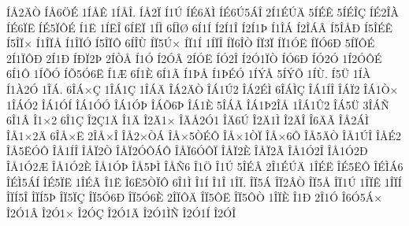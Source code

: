 {^^cd^^c52^^c4^^d2
^^cd^^c56^^d6^^c9
1^^cd^^c5^^ca
1^^cd^^c5^^ce.
^^cd^^c52^^cf
^^cd1^^da
^^cd^^c96^^c4^^cc
^^cd^^c96^^da5^^c1^^ce
2^^cd1^^c9^^da^^c4
5^^cd^^c9^^ca
5^^cd^^c9^^ce^^c7
^^cd^^c92^^ce^^c0
^^cd^^c96^^cf^^cb
^^cd^^c95^^cf^^d4^^c9
^^cd1^^cb
1^^cd^^cb^^ce
6^^cd^^cb^^cf
1^^cd^^cc
6^^cd^^cc^^d8
6^^cd1^^cd
^^cd2^^cd1^^ce
^^cd2^^cd1^^de
^^cd1^^ce^^c1
^^cd2^^ce^^c1^^c2
^^cd5^^ce^^c5^^d0
^^cd5^^ce^^c9^^ca
^^cd5^^ce^^cf^^d7
^^cd1^^ce^^cf^^c5
^^cd1^^ce^^cf^^d3
^^cd5^^ce^^cf^^d4
6^^cd^^ce^^d9
^^cd^^cf5^^da^^d7
^^cd^^cf1^^cd
1^^cd^^cf^^ce
^^cd^^cf6^^ce^^d2
^^cd^^cf3^^cf
^^cd^^cf1^^d3^^cb
^^cd^^cf^^d36^^d0
5^^cd^^cf^^d4^^c9
2^^cd1^^cf^^d4^^d0
2^^cd1^^d0
^^cd^^d0^^cf2^^de
2^^cd^^d2^^c5
^^cd1^^d3
^^cd2^^d3^^c2
2^^cd^^d3^^cb
^^cd^^d32^^ce
^^cd2^^d31^^cf^^d2
^^cd^^d36^^d0
^^cd^^d32^^d3
1^^cd2^^d3^^d4^^c9
6^^cd1^^d4
1^^cd^^d5^^d3
^^cd^^d55^^d36^^cb
^^cd1^^c6
6^^cd1^^c8
6^^cd1^^c3
^^cd1^^de^^c5
^^cd1^^de^^c9^^d3
1^^cd^^dd^^c5
5^^cd^^dd^^d5
1^^cd^^d9.
^^cd5^^dc
1^^cd^^c0
^^cd1^^c02^^d3
1^^ce^^c1.
6^^ce^^c1^^d7^^c7
1^^ce^^c11^^c7
1^^ce^^c1^^c4
^^ce^^c12^^c4^^d2
^^ce^^c11^^da2
^^ce^^c12^^c9^^cc
6^^ce^^c1^^cc^^c7
^^ce^^c11^^cd^^ce
^^ce^^c1^^cf2
^^ce^^c11^^d2^^d7
1^^ce^^c1^^d32
^^ce^^c11^^d3^^cd
^^ce^^c11^^d3^^d3
^^ce^^c11^^d3^^de
^^ce^^c1^^d56^^de
^^ce^^c11^^c8
5^^ce^^c1^^c3
^^ce^^c11^^de2^^ce^^c5
1^^ce^^c11^^db2
^^ce^^c15^^dc
3^^ce^^c1^^d1
6^^ce1^^c2
^^ce1^^d72
6^^ce1^^c7
^^ce2^^c71^^c4
^^ce1^^c4
^^ce2^^c41^^d7
^^ce^^c4^^c52^^d31
^^ce^^c46^^da
^^ce2^^c41^^cc
^^ce2^^c4^^ce
^^ce6^^c4^^c3
^^ce^^c52^^c1^^cc
^^ce^^c51^^d72^^c4
6^^ce^^c5^^d7^^cb
2^^ce^^c5^^d7^^ce
^^ce^^c52^^d7^^d2^^c1
^^ce^^c5^^d75^^d2^^c9^^d4
^^ce^^c5^^d71^^d2^^cf
^^ce^^c5^^d76^^d4
^^ce^^c55^^c4^^d2
^^ce^^c51^^da^^ce
^^ce^^c5^^c92
^^ce^^c55^^cb^^d3^^d4
^^ce^^c51^^cd^^ce
^^ce^^c5^^cf2^^d2
^^ce^^c5^^cf2^^d3^^d4^^c1^^d4
^^ce^^c5^^cf6^^d3^^d4^^cf
^^ce^^c5^^cf2^^c8
^^ce^^c5^^cf2^^c3
^^ce^^c51^^d32^^ce
^^ce^^c51^^d32^^d0
^^ce^^c51^^d32^^c6
^^ce^^c51^^d32^^c8
^^ce^^c51^^d3^^de
^^ce^^c55^^de^^cc
^^ce^^c5^^d16
^^ce1^^d6
^^ce1^^da
5^^ce^^c9^^c2
2^^ce1^^c9^^da^^c4
1^^ce^^c9^^cb
^^ce^^c95^^cb^^d4
^^ce^^c9^^cc^^c16
^^ce^^c9^^cc5^^c1^^cd
^^ce^^c95^^cf^^cb
1^^ce^^c9^^c3
^^ce1^^cb
^^ce6^^cb5^^d2^^cf^^d4
6^^ce1^^cc
^^ce1^^cd
^^ce1^^ce
1^^ce^^cf.
^^ce^^cf5^^c1
^^ce^^cf2^^c2^^d2
^^ce^^cf5^^c5
^^ce^^cf1^^da
1^^ce^^cf^^ca
1^^ce^^cf^^cd
^^ce^^cf^^cd5^^ce
^^ce^^cf^^cd5^^de
^^ce^^cf5^^cf^^c7
^^ce^^cf5^^d36^^d0
^^ce^^cf5^^d36^^c8
2^^ce^^cf^^d4^^c4
^^ce^^cf5^^d4^^cb
^^ce^^cf5^^d4^^d2
1^^ce^^cf^^c8
^^ce1^^d0
2^^ce1^^d3
^^ce6^^d35^^c1^^d7
^^ce2^^d31^^c2
^^ce2^^d31^^d7
^^ce2^^d3^^c7
^^ce2^^d31^^c4
^^ce2^^d31^^cc^^d1
^^ce2^^d31^^cd
^^ce2^^d3^^ce
}
